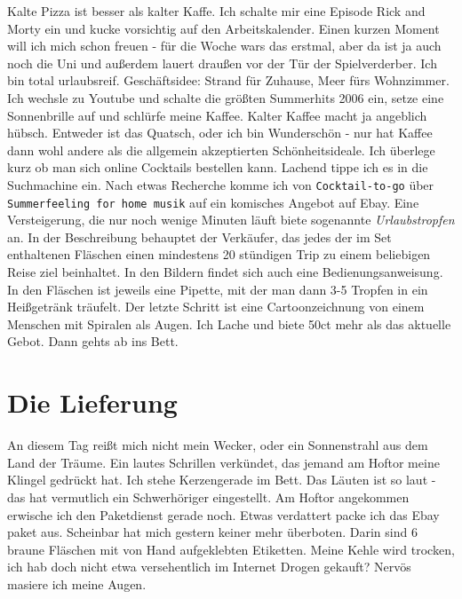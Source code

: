 \documentclass[11pt]{article}
\begin{document}
\noindent Kalte Pizza ist besser als kalter Kaffe. Ich schalte mir
eine Episode Rick and Morty ein und kucke vorsichtig auf den
Arbeitskalender. Einen kurzen Moment will ich mich schon freuen - für
die Woche wars das erstmal, aber da ist ja auch noch die Uni und
außerdem lauert draußen vor der Tür der Spielverderber. Ich bin total
urlaubsreif. Geschäftsidee: Strand für Zuhause, Meer fürs Wohnzimmer. 
Ich wechsle zu Youtube und schalte die größten Summerhits 2006 ein,
setze eine Sonnenbrille auf und schlürfe meine Kaffee. Kalter Kaffee
macht ja angeblich hübsch. Entweder ist das Quatsch, oder ich bin
Wunderschön - nur hat Kaffee dann wohl andere als die allgemein
akzeptierten Schönheitsideale. Ich überlege kurz ob man sich online
Cocktails bestellen kann. Lachend tippe ich es in die Suchmachine
ein. Nach etwas Recherche komme ich von \texttt{Cocktail-to-go} über
\texttt{Summerfeeling for home musik} auf ein komisches Angebot auf
Ebay. Eine Versteigerung, die nur noch wenige Minuten läuft biete
sogenannte \emph{Urlaubstropfen} an. In der Beschreibung behauptet der
Verkäufer, das jedes der im Set enthaltenen Fläschen einen mindestens
20 stündigen Trip zu einem beliebigen Reise ziel beinhaltet. In den
Bildern findet sich auch eine Bedienungsanweisung. In den Fläschen ist
jeweils eine Pipette, mit der man dann 3-5 Tropfen in ein Heißgetränk
träufelt. Der letzte Schritt ist eine Cartoonzeichnung von einem
Menschen mit Spiralen als Augen. Ich Lache und biete 50ct mehr als das
aktuelle Gebot. Dann gehts ab ins Bett.
\section{Die Lieferung}
\label{sec:org67b450e}
An diesem Tag reißt mich nicht mein Wecker, oder ein Sonnenstrahl aus
dem Land der Träume. Ein lautes Schrillen verkündet, das jemand am
Hoftor meine Klingel gedrückt hat. Ich stehe Kerzengerade im Bett. Das
Läuten ist so laut - das hat vermutlich ein Schwerhöriger eingestellt.
Am Hoftor angekommen erwische ich den Paketdienst gerade noch. Etwas
verdattert packe ich das Ebay paket aus. Scheinbar hat mich gestern
keiner mehr überboten. Darin sind 6 braune Fläschen mit von Hand
aufgeklebten Etiketten. Meine Kehle wird trocken, ich hab doch nicht
etwa versehentlich im Internet Drogen gekauft? Nervös masiere ich
meine Augen.
\end{document}
